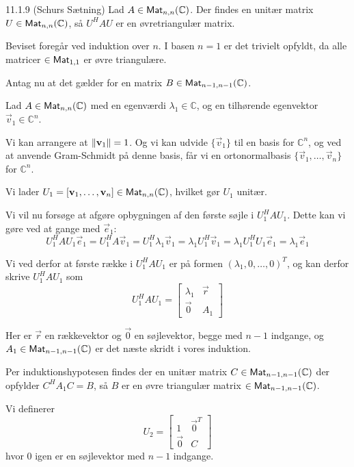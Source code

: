 \begin{saetning}{11.1.9 (Schurs Sætning)}
	Lad $A\in \textsf{Mat}_{n,n}(\mathbb{C})$. Der findes en unitær matrix $U\in \textsf{Mat}_{
	n,n}(\mathbb{C})$, så $U^HAU$ er en øvretriangulær matrix.
\end{saetning}

\begin{bevis}
	\setlength{\parindent}{0cm}
	Beviset foregår ved induktion over $n$. I basen $n=1$ er det trivielt
	opfyldt, da alle matricer $\in \textsf{Mat}_{1,1}$ er øvre triangulære.
	
	\noindent
	Antag nu at det gælder for en matrix $B \in \textsf{Mat}_{n-1,n-1}(\mathbb{C})$.
	
	Lad $A\in \textsf{Mat}_{n,n}(\mathbb{C})$ med en egenværdi $\lambda_1 \in
	\mathbb{C}$, og en tilhørende egenvektor $\vec{v}_1 \in \mathbb{C}^n$.

	Vi kan arrangere at $\lVert\mathbf{v}_1\rVert = 1$. Og vi kan udvide
	$\{\vec{v}_1\}$ til en basis for $\mathbb{C}^n$, og ved at anvende
	Gram-Schmidt på denne basis, får vi en ortonormalbasis $\{\vec{v}_1, \dotsc
	,\vec{v}_n\}$ for $\mathbb{C}^n$.

	Vi lader $U_1 = [\mathbf{v}_1, \dotsc, \mathbf{v}_n] \in \textsf{Mat}_{n,n}(\mathbb{C})$,
	hvilket gør $U_1$ unitær.

	Vi vil nu forsøge at afgøre opbygningen af den første søjle i $U_1^HAU_1$.
	Dette kan vi gøre ved at gange med $\vec{e}_1$:
	\[
		U_1^HAU_1\vec{e}_1
		= U_1^HA\vec{v}_1
		= U_1^H\lambda_1\vec{v}_1
		= \lambda_1U_1^H\vec{v}_1
		= \lambda_1U_1^HU_1\vec{e}_1
		= \lambda_1\vec{e}_1
	\]

	Vi ved derfor at første række i $U_1^HAU_1$ er på formen $(\lambda_1, 0,
	\dotsc,0)^T$, og kan derfor skrive $U_1^HAU_1$ som
	\[
		U_1^HAU_1 = \begin{bmatrix}
			\lambda_1 & \vec{r}\\
			\vec{0}   & A_1
		\end{bmatrix}
	\]

	Her er $\vec{r}$ en rækkevektor og $\vec{0}$ en søjlevektor, begge med
	$n-1$ indgange, og $A_1 \in \textsf{Mat}_{n-1,n-1}(\mathbb{C})$ er det næste skridt
	i vores induktion.
	
	Per induktionshypotesen findes der en unitær matrix $C \in
	\textsf{Mat}_{n-1,n-1}(\mathbb{C})$
	der opfylder $C^HA_1C=B$, så $B$ er en øvre triangulær matrix $\in
	\textsf{Mat}_{n-1,n-1}(\mathbb{C})$.

	Vi definerer
	\[
		U_2 = \begin{bmatrix}
			1       & \vec{0}^T\\
			\vec{0} & C
		\end{bmatrix}
	\]
	hvor $0$ igen er en søjlevektor med $n-1$ indgange.


\end{bevis}
